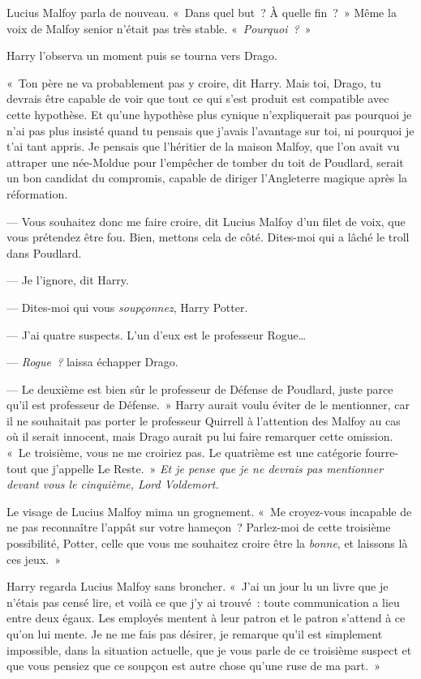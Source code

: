 Lucius Malfoy parla de nouveau. «~Dans quel but~? À quelle fin~?~» Même la voix de Malfoy senior n'était pas très stable. «~\emph{Pourquoi~?}~»

Harry l'observa un moment puis se tourna vers Drago.

«~Ton père ne va probablement pas y croire, dit Harry. Mais toi, Drago, tu devrais être capable de voir que tout ce qui s'est produit est compatible avec cette hypothèse. Et qu'une hypothèse plus cynique n'expliquerait pas pourquoi je n'ai pas plus insisté quand tu pensais que j'avais l'avantage sur toi, ni pourquoi je t'ai tant appris. Je pensais que l'héritier de la maison Malfoy, que l'on avait vu attraper une née-Moldue pour l'empêcher de tomber du toit de Poudlard, serait un bon candidat du compromis, capable de diriger l'Angleterre magique après la réformation.

--- Vous souhaitez donc me faire croire, dit Lucius Malfoy d'un filet de voix, que vous prétendez être fou. Bien, mettons cela de côté. Dites-moi qui a lâché le troll dans Poudlard.

--- Je l'ignore, dit Harry.

--- Dites-moi qui vous \emph{soupçonnez}, Harry Potter.

--- J'ai quatre suspects. L'un d'eux est le professeur Rogue…

--- \emph{Rogue~?} laissa échapper Drago.

--- Le deuxième est bien sûr le professeur de Défense de Poudlard, juste parce qu'il est professeur de Défense.~» Harry aurait voulu éviter de le mentionner, car il ne souhaitait pas porter le professeur Quirrell à l'attention des Malfoy au cas où il serait innocent, mais Drago aurait pu lui faire remarquer cette omission. «~Le troisième, vous ne me croiriez pas. Le quatrième est une catégorie fourre-tout que j'appelle Le Reste.~» \emph{Et je pense que je ne devrais pas mentionner devant vous le cinquième, Lord Voldemort.}

Le visage de Lucius Malfoy mima un grognement. «~Me croyez-vous incapable de ne pas reconnaître l'appât sur votre hameçon~? Parlez-moi de cette troisième possibilité, Potter, celle que vous me souhaitez croire être la \emph{bonne}, et laissons là ces jeux.~»

Harry regarda Lucius Malfoy sans broncher. «~J'ai un jour lu un livre que je n'étais pas censé lire, et voilà ce que j'y ai trouvé~: toute communication a lieu entre deux égaux. Les employés mentent à leur patron et le patron s'attend à ce qu'on lui mente. Je ne me fais pas désirer, je remarque qu'il est simplement impossible, dans la situation actuelle, que je vous parle de ce troisième suspect et que vous pensiez que ce soupçon est autre chose qu'une ruse de ma part.~»


